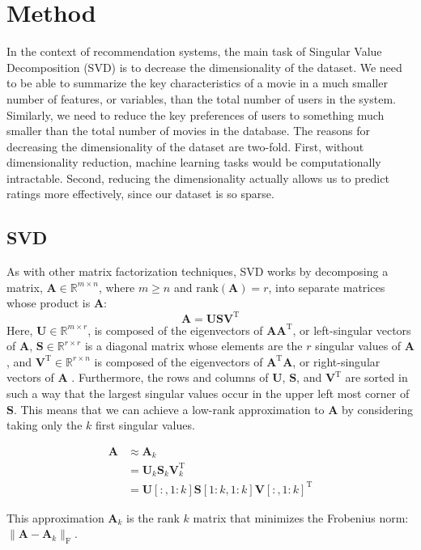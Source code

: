 \documentclass{article} %
\newcommand{\A}{\mathbf{A}}
\newcommand{\T}{\textrm{T}}
\begin{document}
\section{Method}

In the context of recommendation systems, the main task of Singular Value Decomposition (SVD) is to decrease the dimensionality of the dataset.
We need to be able to summarize the key characteristics of a movie in a much smaller number of features, or variables, than the total number of users in the system.
Similarly, we need to reduce the key preferences of users to something much smaller than the total number of movies in the database.
The reasons for decreasing the dimensionality of the dataset are two-fold.
First, without dimensionality reduction, machine learning tasks would be computationally intractable.
Second, reducing the dimensionality actually allows us to predict ratings more effectively, since our dataset is so sparse.

\subsection{SVD}

As with other matrix factorization techniques, SVD works by decomposing a matrix, $\A \in \mathbb{R}^{m \times n}$, where $m \geq n$ and
$\textrm{rank}(\A) = r$,
into separate matrices whose product is $\A$:
$$\A = \mathbf{U}\mathbf{S}\mathbf{V}^{\T}$$
Here, $\mathbf{U} \in \mathbb{R}^{m \times r}$, is composed of the eigenvectors of $\A\A^{\T}$, or left-singular vectors of $\A$, 
$\mathbf{S} \in \mathbb{R}^{r \times r}$ is a diagonal matrix whose elements are the $r$ singular values of $\A$,
and $\mathbf{V}^{\T} \in \mathbb{R}^{r \times n}$ is composed of the
eigenvectors of $\A^{\T}\A$, or right-singular vectors of $\A$
\citep{golub1970}.
Furthermore, the rows and columns of $\mathbf{U}$, $\mathbf{S}$, and $\mathbf{V}^{\T}$ are sorted in such a way that the largest singular values occur in the upper left most corner of $\mathbf{S}$.
This means that we can achieve a low-rank approximation to $\A$ by considering taking only the $k$ first singular values.

\begin{align*}
	\A &\approx \A_k\\
	&= \mathbf{U}_k\mathbf{S}_k\mathbf{V}_k^{\T}\\
	&= \mathbf{U}[:,1:k]\mathbf{S}[1:k,1:k]\mathbf{V}[:,1:k]^{\T}
\end{align*}

This approximation $\A_k$ is the rank $k$ matrix that minimizes the Frobenius norm: $\|\A - \A_k\|_{\textrm{F}}$.
\end{document}
